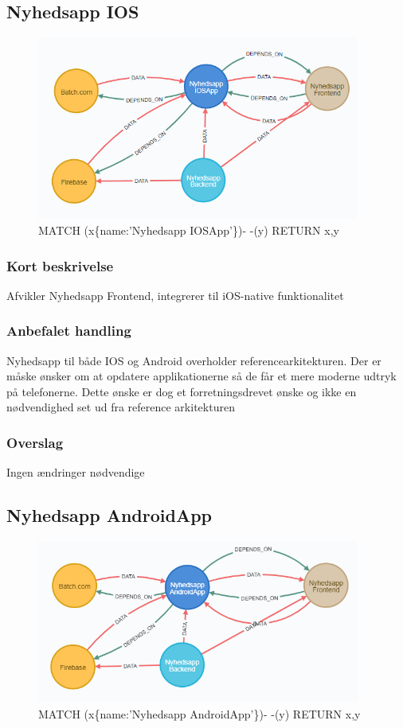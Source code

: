 \documentclass{article}
\begin{document}
\subsection{Nyhedsapp IOS}
\begin{figure}[h]
\includegraphics[width=300pt]{Nyhedsapp-IOS.PNG}
\caption{MATCH (x\{name:'Nyhedsapp IOSApp'\})- -(y) RETURN x,y}
\end{figure}
\subsubsection{Kort beskrivelse}
Afvikler Nyhedsapp Frontend, integrerer til iOS-native funktionalitet
\subsubsection{Anbefalet handling}
Nyhedsapp til både IOS og Android overholder referencearkitekturen. Der er måske ønsker om at opdatere applikationerne så de får et mere moderne udtryk på telefonerne. Dette ønske er dog et forretningsdrevet ønske og ikke en nødvendighed set ud fra reference arkitekturen
\subsubsection{Overslag}
Ingen ændringer nødvendige

\subsection{Nyhedsapp AndroidApp}
\begin{figure}[h]
\includegraphics[width=300pt]{Nyhedsapp-Android.PNG}
\caption{MATCH (x\{name:'Nyhedsapp AndroidApp'\})- -(y) RETURN x,y}
\end{figure}
\end{document}
